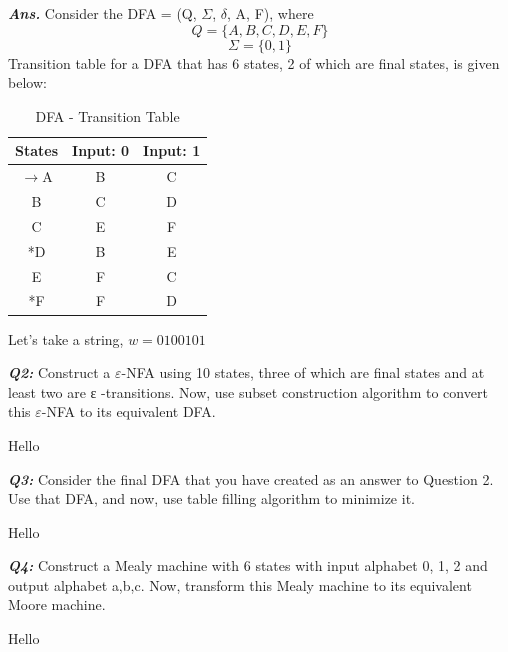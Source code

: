 \documentclass[12pt,a4paper]{article}
\begin{document}
\textbf{\textit{Ans.}} Consider the DFA = (Q, $\Sigma$, $\delta$, A, F), where\\
\[ Q = \{A, B, C, D, E, F\} \]
\[ \Sigma = \{0, 1\} \]
Transition table for a DFA that has 6 states, 2 of which are final states, is given below:
\begin{table}[h!]
    \begin{center}
        \begin{tabular}{|c|c|c|}
	    States & Input: 0 & Input: 1 \\ \hline
   $\rightarrow$A & B & C \\ \hline
		 B & C & D \\ \hline
		 C & E & F \\ \hline
		*D & B & E \\ \hline
		 E & F & C \\ \hline
		*F & F & D \\ \hline
        \end{tabular}
	\caption{DFA - Transition Table}
    \end{center}
\end{table}

Let's take a string, $w = 0100101$



{\color{PineGreen} \textbf{\textit{Q2:}} Construct a $\varepsilon$-NFA using 10 states, three of which are final states and at least two are ε -transitions.
Now, use subset construction algorithm to convert this $\varepsilon$-NFA to its equivalent DFA.}

Hello

{\color{PineGreen} \textbf{\textit{Q3:}} Consider the final DFA that you have created as an answer to Question 2. Use that DFA, and
now, use table filling algorithm to minimize it.} 

Hello

{\color{PineGreen} \textbf{\textit{Q4:}} Construct a Mealy machine with 6 states with input alphabet {0, 1, 2} and output alphabet
{a,b,c}. Now, transform this Mealy machine to its equivalent Moore machine.}

Hello
\end{document}
